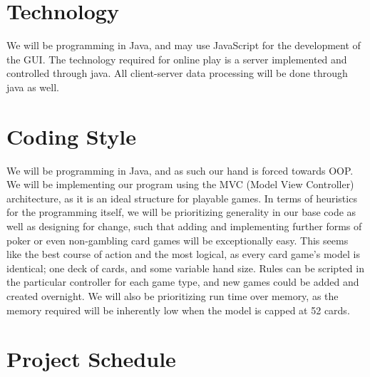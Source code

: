 \documentclass{article}
\begin{document}
\section{Technology}

We will be programming in Java, and may use JavaScript for the development of the GUI. The technology required for online play is a server implemented and controlled through java. All client-server data processing will be done through java as well.


\section{Coding Style}

We will be programming in Java, and as such our hand is forced towards OOP. We will be implementing our program using the MVC (Model View Controller) architecture, as it is an ideal structure for playable games. In terms of heuristics for the programming itself, we will be prioritizing generality in our base code as well as designing for change, such that adding and implementing further forms of poker or even non-gambling card games will be exceptionally easy. This seems like the best course of action and the most logical, as every card game's model is identical; one deck of cards, and some variable hand size. Rules can be scripted in the particular controller for each game type, and new games could be added and created overnight. We will also be prioritizing run time over memory, as the memory required will be inherently low when the model is capped at 52 cards. 

\section{Project Schedule}


\end{document}
